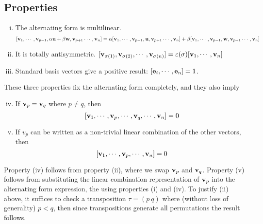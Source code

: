 \subsection{Properties}
\begin{enumerate}[(i)]
	\item The alternating form is multilinear.
	      \[
		      [ \vb v_1, \cdots, \vb v_{p-1}, \alpha \vb u + \beta \vb w, \vb v_{p+1} \cdots, \vb v_n ] = \alpha [ \vb v_1, \cdots, \vb v_{p-1}, \vb u, \vb v_{p+1} \cdots, \vb v_n ] + \beta [ \vb v_1, \cdots, \vb v_{p-1}, \vb w, \vb v_{p+1} \cdots, \vb v_n ]
	      \]
	\item It is totally antisymmetric.
	      \([ \vb v_{\sigma(1)}, \vb v_{\sigma(2)}, \cdots, \vb v_{\sigma(n)} ] = \varepsilon(\sigma) [ \vb v_1, \cdots, \vb v_n ]\)
	\item Standard basis vectors give a positive result: \([\vb e_i, \cdots, \vb e_n] = 1\).
\end{enumerate}
These three properties fix the alternating form completely, and they also imply
\begin{enumerate}[(i)]
	\setcounter{enumi}{3}
	\item If \(\vb v_p = \vb v_q\) where \(p \neq q\), then
	      \[
		      [\vb v_1, \cdots, \vb v_p, \cdots, \vb v_q, \cdots, \vb v_n ] = 0
	      \]
	\item If \(v_p\) can be written as a non-trivial linear combination of the other vectors, then
	      \[
		      [\vb v_1, \cdots, \vb v_p, \cdots, \vb v_n ] = 0
	      \]
\end{enumerate}
Property (iv) follows from property (ii), where we swap \(\vb v_p\) and \(\vb v_q\).
Property (v) follows from substituting the linear combination representation of \(\vb v_p\) into the alternating form expression, the using properties (i) and (iv).
To justify (ii) above, it suffices to check a transposition \(\tau = (p\ q)\) where (without loss of generality) \(p < q\), then since transpositions generate all permutations the result follows.
